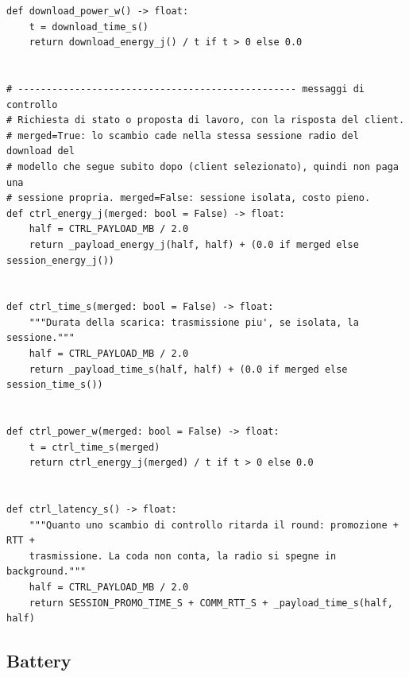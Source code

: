 \documentclass[11pt,a4paper]{article}
\begin{document}
\begin{lstlisting}[style=py,firstnumber=44,caption={\texttt{tesifl/device/communication\_model.py}, lines 44--131}]
def download_power_w() -> float:
    t = download_time_s()
    return download_energy_j() / t if t > 0 else 0.0


# ------------------------------------------------- messaggi di controllo
# Richiesta di stato o proposta di lavoro, con la risposta del client.
# merged=True: lo scambio cade nella stessa sessione radio del download del
# modello che segue subito dopo (client selezionato), quindi non paga una
# sessione propria. merged=False: sessione isolata, costo pieno.
def ctrl_energy_j(merged: bool = False) -> float:
    half = CTRL_PAYLOAD_MB / 2.0
    return _payload_energy_j(half, half) + (0.0 if merged else session_energy_j())


def ctrl_time_s(merged: bool = False) -> float:
    """Durata della scarica: trasmissione piu', se isolata, la sessione."""
    half = CTRL_PAYLOAD_MB / 2.0
    return _payload_time_s(half, half) + (0.0 if merged else session_time_s())


def ctrl_power_w(merged: bool = False) -> float:
    t = ctrl_time_s(merged)
    return ctrl_energy_j(merged) / t if t > 0 else 0.0


def ctrl_latency_s() -> float:
    """Quanto uno scambio di controllo ritarda il round: promozione + RTT +
    trasmissione. La coda non conta, la radio si spegne in background."""
    half = CTRL_PAYLOAD_MB / 2.0
    return SESSION_PROMO_TIME_S + COMM_RTT_S + _payload_time_s(half, half)
\end{lstlisting}

\subsection{Battery}
\end{document}
